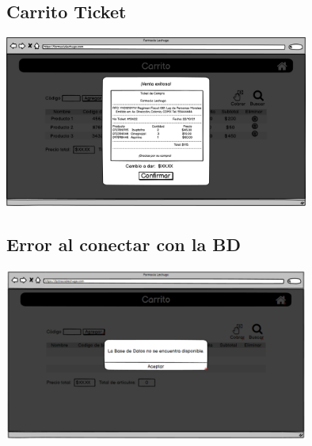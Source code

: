 \begin{flushleft}
	\subsection{Carrito Ticket} \label{UI: carrito ticket}
	\begin{center}
		\includegraphics[width=10cm]{pantallas/images/9carritoticket.png}\\	
		 	
	\end{center}
	\subsection{Error al conectar con la BD} \label{Error al conectar con la BD}
	\begin{center}
		\includegraphics[width=10cm]{pantallas/images/33ErrorBD.png}\\	
		 	
	\end{center}

\end{flushleft}
